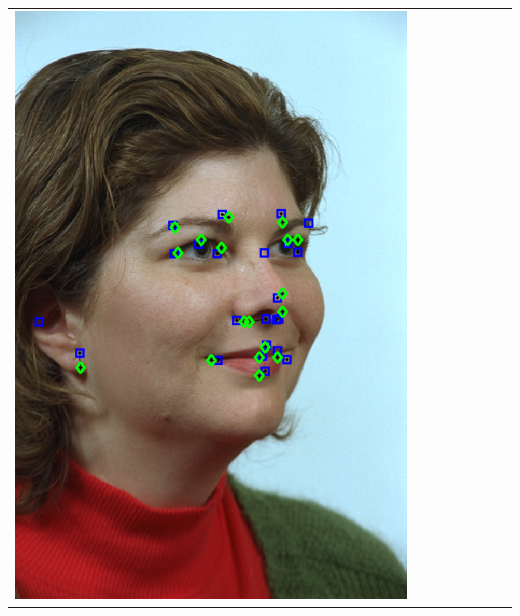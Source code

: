 \documentclass[portrait,final,a0paper,fontscale=0.277]{baposter}
\begin{document}
\begin{poster}
{{\begin{tabular}{@{}rccccccc@{}}
\parbox[c]{0.11\linewidth}{\includegraphics[width=\linewidth]{images/l_qr_success_1.pdf}} &

\end{tabular}}}
\end{poster}
\end{document}
